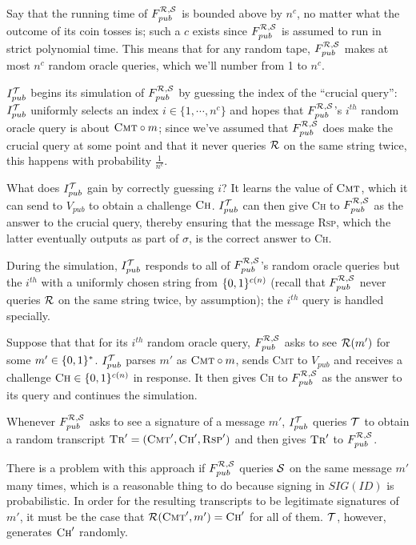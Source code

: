 \documentclass[12pt,twoside]{article}
\begin{document}
\begin{enumerate}
Say that the running time of $F_{pub}^{\mathcal{R},\mathcal{S}}$ is bounded above by
$n^c$, no matter what the outcome of its coin tosses is; such a $c$ exists since
$F_{pub}^{\mathcal{R},\mathcal{S}}$ is assumed to run in strict polynomial time. This
means that for any random tape, $F_{pub}^{\mathcal{R},\mathcal{S}}$ makes at most $n^c$ 
random oracle queries, which we'll number from 1 to $n^c$. 

$I_{pub}^{\mathcal{T}}$ begins its simulation of $F_{pub}^{\mathcal{R},\mathcal{S}}$ by
guessing the index of the ``crucial query'': $I_{pub}^{\mathcal{T}}$ uniformly 
selects an index $i \in \{1,\cdots,n^c\}$ and hopes that
$F_{pub}^{\mathcal{R},\mathcal{S}}$'s $i^{th}$ random oracle query is about
$\textsc{Cmt}\circ m$; since we've assumed that $F_{pub}^{\mathcal{R},\mathcal{S}}$ does 
make the crucial query at some point and that it never queries $\mathcal{R}$ on the 
same string twice, this happens with probability $\frac{1}{n^c}$. 

What does $I_{pub}^{\mathcal{T}}$ gain by correctly guessing $i$? It learns the value 
of $\textsc{Cmt}$, which it can send to $V_{pub}$ to obtain a challenge
$\textsc{Ch}$. $I_{pub}^{\mathcal{T}}$ can then give \textsc{Ch} to 
$F_{pub}^{\mathcal{R},\mathcal{S}}$ as the answer to the crucial query, thereby ensuring
that the message \textsc{Rsp}, which the latter eventually outputs as
part of $\sigma$, is the correct answer to \textsc{Ch}.

During the simulation, $I_{pub}^{\mathcal{T}}$ responds to all of 
$F_{pub}^{\mathcal{R},\mathcal{S}}$'s random oracle queries but the $i^{th}$ with a 
uniformly chosen string from $\{0,1\}^{c(n)}$ (recall that $F_{pub}^{\mathcal{R},\mathcal{S}}$
never queries $\mathcal{R}$ on the same string twice, by assumption); the $i^{th}$ 
query is handled specially. 

Suppose that that for its $i^{th}$ random oracle query, $F_{pub}^{\mathcal{R},\mathcal{S}}$
asks to see $\mathcal{R}(m')$ for some $m' \in \{0,1\}^{*}$. $I_{pub}^{\mathcal{T}}$ parses
$m'$ as $\textsc{Cmt}\circ m$, sends \textsc{Cmt} to $V_{pub}$ and receives a
challenge $\textsc{Ch} \in \{0,1\}^{c(n)}$ in response. It then gives \textsc{Ch}
to $F_{pub}^{\mathcal{R},\mathcal{S}}$ as the answer to its query and continues the
simulation.

Whenever $F_{pub}^{\mathcal{R},\mathcal{S}}$ asks to see a signature of a message $m'$,
$I_{pub}^{\mathcal{T}}$ queries $\mathcal{T}$ to obtain a random transcript
$\textsc{Tr}' = (\textsc{Cmt}',\textsc{Ch}',\textsc{Rsp}')$ and then gives 
$\textsc{Tr}'$ to $F_{pub}^{\mathcal{R},\mathcal{S}}$. 

There is a problem with this approach if $F_{pub}^{\mathcal{R},\mathcal{S}}$ 
queries $\mathcal{S}$ on the same message $m'$ many times, which is a reasonable
thing to do because signing in $SIG(ID)$ is probabilistic. In order for the 
resulting transcripts to be legitimate signatures of $m'$, it must be the case 
that $\mathcal{R}(\textsc{Cmt}',m') = \textsc{Ch}'$ for all of them. $\mathcal{T}$, however,
generates $\textsc{Ch}'$ randomly. 


\end{enumerate}
\end{document}
